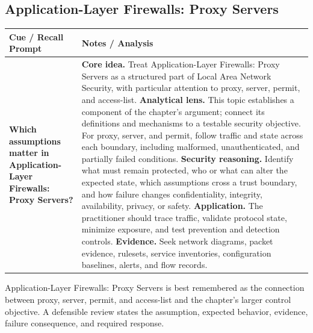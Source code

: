 \documentclass[11pt]{article}
\newcommand{\CornellHeader}{%
\rowcolor{Navy}\color{white}\bfseries Cue / Recall Prompt & \color{white}\bfseries Notes / Analysis\\\hline}
\newcommand{\CornellRow}[2]{%
\cellcolor{CueGray}\RaggedRight\textbf{#1} & \RaggedRight #2\\\hline}
\begin{document}
\subsection*{Application-Layer Firewalls: Proxy Servers}
\begin{longtable}{>{\RaggedRight\arraybackslash}p{}|>{\RaggedRight\arraybackslash}p{}}
\CornellHeader
\CornellRow{Which assumptions matter in Application-Layer Firewalls: Proxy Servers?}{\textbf{Core idea.} Treat Application-Layer Firewalls: Proxy Servers as a structured part of Local Area Network Security, with particular attention to proxy, server, permit, and access-list. \textbf{Analytical lens.} This topic establishes a component of the chapter's argument; connect its definitions and mechanisms to a testable security objective. For proxy, server, and permit, follow traffic and state across each boundary, including malformed, unauthenticated, and partially failed conditions. \textbf{Security reasoning.} Identify what must remain protected, who or what can alter the expected state, which assumptions cross a trust boundary, and how failure changes confidentiality, integrity, availability, privacy, or safety. \textbf{Application.} The practitioner should trace traffic, validate protocol state, minimize exposure, and test prevention and detection controls. \textbf{Evidence.} Seek network diagrams, packet evidence, rulesets, service inventories, configuration baselines, alerts, and flow records.}
\end{longtable}
\begin{topicsummary}
Application-Layer Firewalls: Proxy Servers is best remembered as the connection between proxy, server, permit, and access-list and the chapter's larger control objective. A defensible review states the assumption, expected behavior, evidence, failure consequence, and required response.
\end{topicsummary}
\end{document}
